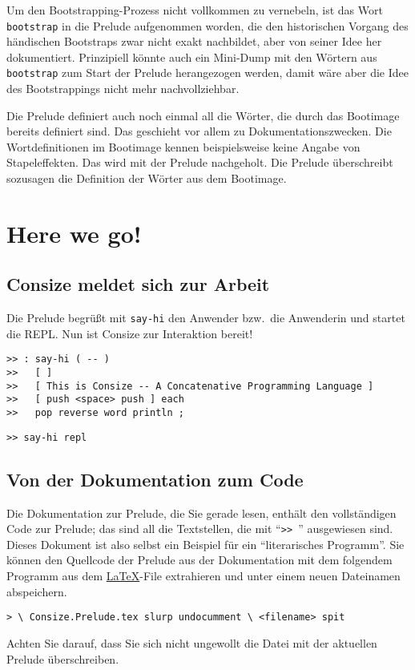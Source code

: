 Um den Bootstrapping-Prozess nicht vollkommen zu vernebeln, ist das Wort \verb|bootstrap| in die Prelude aufgenommen worden, die den historischen Vorgang des händischen Bootstraps zwar nicht exakt nachbildet, aber von seiner Idee her dokumentiert. Prinzipiell könnte auch ein Mini-Dump mit den Wörtern aus \verb|bootstrap| zum Start der Prelude herangezogen werden, damit wäre aber die Idee des Bootstrappings nicht mehr nachvollziehbar.

Die Prelude definiert auch noch einmal all die Wörter, die durch das Bootimage bereits definiert sind. Das geschieht vor allem zu Dokumentationszwecken. Die Wortdefinitionen im Bootimage kennen beispielsweise keine Angabe von Stapeleffekten. Das wird mit der Prelude nachgeholt. Die Prelude überschreibt sozusagen die Definition der Wörter aus dem Bootimage.

\section{Here we go!}

\subsection{Consize meldet sich zur Arbeit}

Die Prelude begrüßt mit \verb|say-hi| den Anwender bzw.\ die Anwenderin und startet die REPL. Nun ist Consize zur Interaktion bereit!

\begin{verbatim}
>> : say-hi ( -- )
>>   [ ]
>>   [ This is Consize -- A Concatenative Programming Language ]
>>   [ push <space> push ] each
>>   pop reverse word println ;
\end{verbatim}

\begin{verbatim}
>> say-hi repl
\end{verbatim}

\subsection{Von der Dokumentation zum Code}

Die Dokumentation zur Prelude, die Sie gerade lesen, enthält den voll\-stän\-di\-gen Code zur Prelude; das sind all die Textstellen, die mit "`\verb|>> |"' ausgewiesen sind. Dieses Dokument ist also selbst ein Beispiel für ein "`literarisches Programm"'. Sie können den Quellcode der Prelude aus der Dokumentation mit dem folgendem Programm aus dem \href{http://de.wikipedia.org/wiki/LaTeX}{\LaTeX}-File extrahieren und unter einem neuen Dateinamen abspeichern.

\begin{verbatim}
> \ Consize.Prelude.tex slurp undocumment \ <filename> spit
\end{verbatim}

Achten Sie darauf, dass Sie sich nicht ungewollt die Datei mit der aktuellen Prelude überschreiben.


